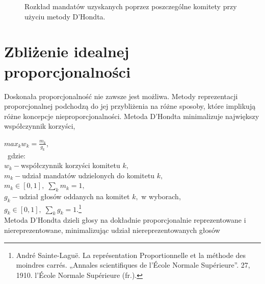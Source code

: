 \documentclass[12pt,a4paper,titlepage]{report}
\begin{document}
\begin{figure}[!htb]
\caption{Rozkład mandatów uzyskanych poprzez poszczególne komitety przy użyciu metody D'Hondta.}
\end{figure}
\newpage
\section{Zbliżenie idealnej proporcjonalności}
Doskonała proporcjonalność nie zawsze jest możliwa. Metody reprezentacji proporcjonalnej podchodzą do jej przybliżenia na różne sposoby, które implikują różne koncepcje nieproporcjonalności. Metoda D’Hondta minimalizuje największy współczynnik korzyści, 

\begin{math}max_{k}w_{k}={\frac {m_{k}}{g_{k}}}\end{math}, \\ \
gdzie: \\
\begin{math}w_{k}-\end{math}współczynnik korzyści komitetu
\begin{math}k,\end{math} \\
\begin{math}m_{k}-\end{math}udział mandatów udzielonych do komitetu
\begin{math}k,\end{math} \\
\begin{math} m_{k}\in [0,1],\;\sum\limits _{k}m_{k}=1,\end{math} \\
\begin{math}g_{k}-\end{math}udział głosów oddanych na komitet
\begin{math}k,\end{math} w wyborach,\\
\begin{math} g_{k}\in [0,1],\;\sum\limits_{k} g_{k}=1.\end{math}\footnote{André Sainte-Laguë. La représentation Proportionnelle et la méthode des moindres carrés. „Annales scientifiques de l’École Normale Supérieure”. 27, 1910. l’École Normale Supérieure (fr.).} \\
Metoda D’Hondta dzieli głosy na dokładnie proporcjonalnie reprezentowane i niereprezentowane, minimalizując udział niereprezentowanych głosów 
\end{document}

